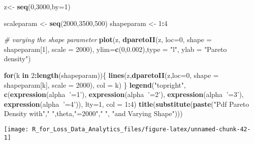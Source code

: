 \documentclass[]{book}
\newenvironment{Shaded}{\begin{snugshade}}{\end{snugshade}}
\newcommand{\KeywordTok}[1]{\textcolor[rgb]{0.13,0.29,0.53}{\textbf{#1}}}
\newcommand{\DataTypeTok}[1]{\textcolor[rgb]{0.13,0.29,0.53}{#1}}
\newcommand{\DecValTok}[1]{\textcolor[rgb]{0.00,0.00,0.81}{#1}}
\newcommand{\FloatTok}[1]{\textcolor[rgb]{0.00,0.00,0.81}{#1}}
\newcommand{\StringTok}[1]{\textcolor[rgb]{0.31,0.60,0.02}{#1}}
\newcommand{\CommentTok}[1]{\textcolor[rgb]{0.56,0.35,0.01}{\textit{#1}}}
\newcommand{\ControlFlowTok}[1]{\textcolor[rgb]{0.13,0.29,0.53}{\textbf{#1}}}
\newcommand{\OperatorTok}[1]{\textcolor[rgb]{0.81,0.36,0.00}{\textbf{#1}}}
\newcommand{\NormalTok}[1]{#1}
\theoremstyle{definition}
\theoremstyle{definition}
\theoremstyle{definition}
\theoremstyle{remark}
\begin{document}
\begin{Shaded}
\begin{Highlighting}[]
\NormalTok{z<-}\StringTok{ }\KeywordTok{seq}\NormalTok{(}\DecValTok{0}\NormalTok{,}\DecValTok{3000}\NormalTok{,}\DataTypeTok{by=}\DecValTok{1}\NormalTok{)}

\NormalTok{scaleparam <-}\StringTok{ }\KeywordTok{seq}\NormalTok{(}\DecValTok{2000}\NormalTok{,}\DecValTok{3500}\NormalTok{,}\DecValTok{500}\NormalTok{)}
\NormalTok{shapeparam <-}\StringTok{ }\DecValTok{1}\OperatorTok{:}\DecValTok{4}

\CommentTok{# varying the shape parameter}
\KeywordTok{plot}\NormalTok{(z, }\KeywordTok{dparetoII}\NormalTok{(z, }\DataTypeTok{loc=}\DecValTok{0}\NormalTok{, }\DataTypeTok{shape =}\NormalTok{ shapeparam[}\DecValTok{1}\NormalTok{], }\DataTypeTok{scale =} \DecValTok{2000}\NormalTok{), }\DataTypeTok{ylim=}\KeywordTok{c}\NormalTok{(}\DecValTok{0}\NormalTok{,}\FloatTok{0.002}\NormalTok{),}\DataTypeTok{type =} \StringTok{"l"}\NormalTok{, }\DataTypeTok{ylab =} \StringTok{"Pareto density"}\NormalTok{)}

\ControlFlowTok{for}\NormalTok{(k }\ControlFlowTok{in} \DecValTok{2}\OperatorTok{:}\KeywordTok{length}\NormalTok{(shapeparam))\{}
  \KeywordTok{lines}\NormalTok{(z,}\KeywordTok{dparetoII}\NormalTok{(z,}\DataTypeTok{loc=}\DecValTok{0}\NormalTok{, }\DataTypeTok{shape =}\NormalTok{ shapeparam[k], }\DataTypeTok{scale =} \DecValTok{2000}\NormalTok{), }\DataTypeTok{col =}\NormalTok{ k)}
\NormalTok{\}}
\KeywordTok{legend}\NormalTok{(}\StringTok{"topright"}\NormalTok{, }\KeywordTok{c}\NormalTok{(}\KeywordTok{expression}\NormalTok{(alpha}\OperatorTok{~}\StringTok{'=1'}\NormalTok{), }\KeywordTok{expression}\NormalTok{(alpha}\OperatorTok{~}\StringTok{'=2'}\NormalTok{), }\KeywordTok{expression}\NormalTok{(alpha}\OperatorTok{~}\StringTok{'=3'}\NormalTok{), }\KeywordTok{expression}\NormalTok{(alpha}\OperatorTok{~}\StringTok{'=4'}\NormalTok{)), }\DataTypeTok{lty=}\DecValTok{1}\NormalTok{, }\DataTypeTok{col =} \DecValTok{1}\OperatorTok{:}\DecValTok{4}\NormalTok{)}
\KeywordTok{title}\NormalTok{(}\KeywordTok{substitute}\NormalTok{(}\KeywordTok{paste}\NormalTok{(}\StringTok{"Pdf Pareto Density with"}\NormalTok{,}\StringTok{" "}\NormalTok{,theta,}\StringTok{"=2000"}\NormalTok{,}\StringTok{" "}\NormalTok{, }\StringTok{"and Varying Shape"}\NormalTok{)))}
\end{Highlighting}
\end{Shaded}

\begin{center}\texttt{[image: R\_for\_Loss\_Data\_Analytics\_files/figure-latex/unnamed-chunk-42-1]} \end{center}
\end{document}
